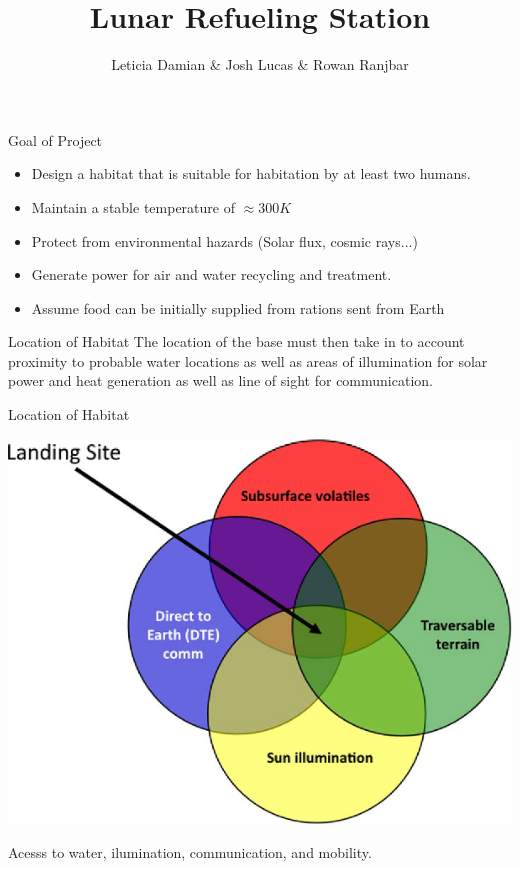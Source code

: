 \documentclass{beamer}
\title{ Lunar Refueling Station}
\author{Leticia Damian \& Josh Lucas \& Rowan Ranjbar }
\institute[CSUSM] %
{
  \inst{1}%
  Dept. of Physics\\
  California State University San Marcos
}
\date %
\begin{document}
 
\frame{\titlepage}


\begin{frame}{Goal of Project}
\begin{itemize}
\item Design a habitat that is suitable for habitation by at least two humans.\\
\item Maintain a stable temperature of $\approx 300K$
\item Protect from environmental hazards (Solar flux, cosmic rays...)
\item Generate power for air and water recycling and treatment.
\item Assume food can be initially supplied from rations sent from Earth
\end{itemize}

\end{frame}


\begin{frame}{Location of Habitat}
  The location of the base must then take in to account proximity to probable water locations as well as areas of illumination for solar power and heat generation as well as line of sight for communication.
\end{frame}


\begin{frame}{Location of Habitat}
      \begin{center}
             \includegraphics[width= .75\textwidth]{site.eps}   
      \end{center}  
     Acesss to water, ilumination, communication, and mobility. \cite{Heldmann}
\end{frame}
\end{document}
